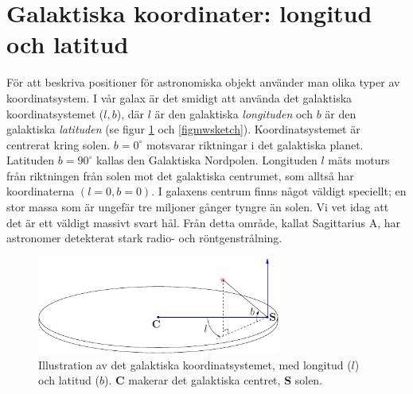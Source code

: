 \section{Galaktiska koordinater: longitud och latitud}
\label{sect:galcoords}
För att beskriva positioner för astronomiska objekt använder man olika
typer av koordinatsystem. I vår galax är det smidigt att använda det
galaktiska koordinatsystemet ($l,b$), där $l$ är den galaktiska
\emph{longituden} och $b$ är den galaktiska \emph{latituden} (se figur 
\ref{figdisc} och \ref{figmwsketch}). Koordinatsystemet är centrerat
kring solen. $b=0^{\circ}$ motsvarar riktningar i det galaktiska
planet. Latituden $b=90^{\circ}$ kallas den Galaktiska Nordpolen. Longituden
$l$ mäts moturs från riktningen från solen mot det galaktiska
centrumet, som alltså har koordinaterna $(l=0, b=0)$. I galaxens
centrum finns något väldigt speciellt; en stor massa som är ungefär
tre miljoner gånger tyngre än solen. Vi vet idag att det är ett
väldigt massivt svart hål. Från detta område, kallat Sagittarius A,
har astronomer detekterat stark radio- och röntgenstrålning.

\begin{figure}[ht]
\begin{center}
\includegraphics[width=8cm]{../figures/galdisc.pdf}
\end{center}
\caption{Illustration av det galaktiska koordinatsystemet, med longitud ($l$)
och latitud ($b$).  {\bf C} makerar det galaktiska centret, {\bf S} solen.}
\label{figdisc}
\end{figure} 

